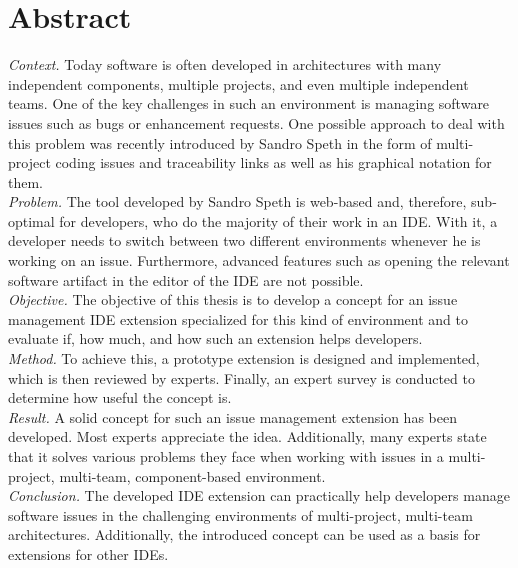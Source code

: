 \documentclass[
  a4paper,  %
  twoside,  %
  bibliography=totoc,
  headsepline,
  cleardoublepage=empty,
  parskip=half,
  draft=false
]{scrbook}
\begin{document}
\section*{Abstract}
\textit{Context.} Today software is often developed in architectures with many independent components, multiple projects, and even multiple independent teams. 
One of the key challenges in such an environment is managing software issues such as bugs or enhancement requests. 
One possible approach to deal with this problem was recently introduced by Sandro Speth in the form of multi-project coding issues and traceability links
as well as his graphical notation for them. \\
\textit{Problem.} The tool developed by Sandro Speth is web-based and, therefore, sub-optimal for developers, 
who do the majority of their work in an \gls{IDE}. 
With it, a developer needs to switch between two different environments whenever he is working on an issue. 
Furthermore, advanced features such as opening the relevant software artifact in the editor of the \gls{IDE} are not possible. \\
\textit{Objective.} The objective of this thesis is to develop a concept for an issue management \gls{IDE} extension specialized for this kind of environment and to evaluate if, how much, and how such an extension helps developers. \\
\textit{Method.} To achieve this, a prototype extension is designed and implemented, which is then reviewed by experts.
Finally, an expert survey is conducted to determine how useful the concept is.\\
\textit{Result.} A solid concept for such an issue management extension has been developed. 
Most experts appreciate the idea. Additionally, many experts state that it solves various problems they face when working with issues in a multi-project, multi-team, component-based environment.\\
\textit{Conclusion.} The developed \gls{IDE} extension can practically help developers manage software issues in the challenging environments of multi-project, multi-team architectures. Additionally, the introduced concept can be used as a basis for extensions for other \glspl{IDE}.
\cleardoublepage
\end{document}
